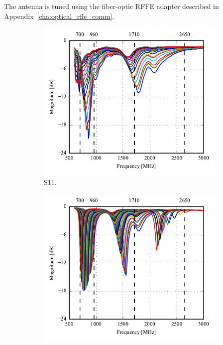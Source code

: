 The antenna is tuned using the fiber-optic RFFE adapter described in Appendix~\ref{cha:optical_rffe_comm}.

\begin{figure}[htbp]
    \centering
    \begin{subfigure}{0.49\linewidth}
        \includegraphics{img/tech_sol/pcb_trianglefeed/S11}
        \caption{S11.}
    \end{subfigure}
    \hfill
    \begin{subfigure}{0.49\linewidth}
        \includegraphics{img/tech_sol/pcb_trianglefeed/S22}

\end{subfigure}
\end{figure}
